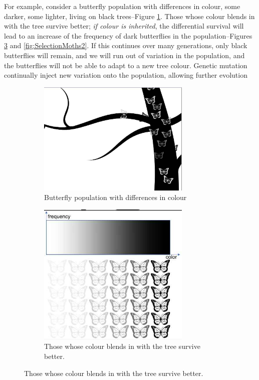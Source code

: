 \documentclass[]{article}
\begin{document}
For example, consider a butterfly population with differences in colour, some darker, some lighter, living on black trees--Figure \ref{fig:SelectionMoths0}. Those whose colour blends in with the tree survive better; \emph{ if colour is inherited}, the differential survival will lead to an increase of the frequency of dark butterflies in the population--Figures \ref{fig:SelectionMoths1} and  \ref{fig:SelectionMoths2}. If this continues over many generations, only black butterflies will remain, and we will run out of variation in the population, and the butterflies will not be able to adapt to a new tree colour. Genetic mutation continually inject new variation onto the population, allowing further evolution
\begin{figure}[H]
	\caption{Example of natural selection--light and dark butterflies}\label{fig:SelectionMoths}
	\begin{subfigure}[t]{0.3\textwidth}
		\caption{Butterfly population with differences in colour}\label{fig:SelectionMoths0}
		\includegraphics[width=0.8\textwidth]{SelectionMoths}
	\end{subfigure}
	\;\;\;
	\begin{subfigure}[t]{0.3\textwidth}
		\caption{Those whose colour blends in with the tree survive better.}\label{fig:SelectionMoths1}
		\includegraphics[width=0.8\textwidth]{SelectionMoths1}

\end{subfigure}
\end{figure}
\end{document}
